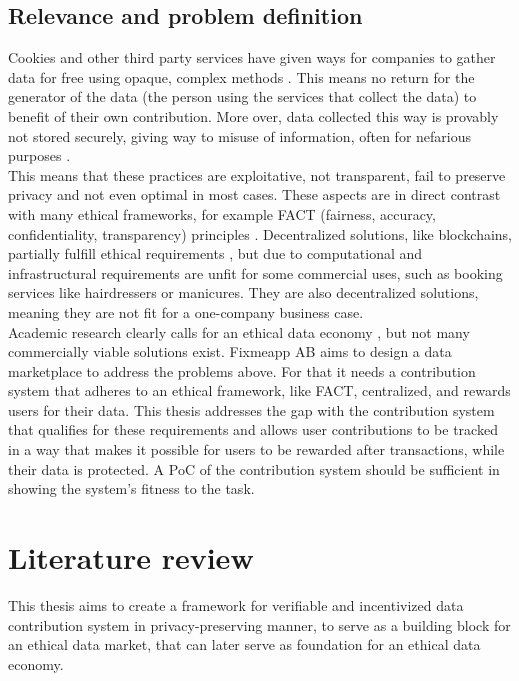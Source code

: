 \documentclass[a4paper,11pt]{report} %
\theoremstyle{change}
\theoremstyle{theoremstyle}
\begin{document}
\section{Relevance and problem definition}
Cookies and other third party services have given ways for companies to gather data for free using opaque, complex methods \cite{altaweel2015web}\cite{demir2022towards}\cite{narayanan2017princeton}\cite{veale2022adtech}. This means no return for the generator of the data (the person using the services that collect the data) to benefit of their own contribution. More over, data collected this way is provably not stored securely, giving way to misuse of information, often for nefarious purposes \cite{langvardt2024media}\cite{cross2025examining}.\\
This means that these practices are exploitative, not transparent, fail to preserve privacy and not even optimal in most cases. These aspects are in direct contrast with many ethical frameworks, for example FACT (fairness, accuracy, confidentiality, transparency) principles \cite{sohail2024data}. Decentralized solutions, like blockchains, partially fulfill ethical requirements \cite{sansone2023blockchain}, but due to computational and infrastructural requirements are unfit for some commercial uses, such as booking services like hairdressers or manicures. They are also decentralized solutions, meaning they are not fit for a one-company business case.\\
Academic research clearly calls for an ethical data economy \cite{koskinen2019if}\cite{koskinen2023ethical}\cite{rantanen2020ethical}\cite{rantanen2020humans}, but not many commercially viable solutions exist. Fixmeapp AB aims to design a data marketplace to address the problems above. For that it needs a contribution system that adheres to an ethical framework, like FACT, centralized, and rewards users for their data. This thesis addresses the gap with the contribution system that qualifies for these requirements and allows user contributions to be tracked in a way that makes it possible for users to be rewarded after transactions, while their data is protected. A PoC of the contribution system should be sufficient in showing the system's fitness to the task.


\chapter{Literature review}
This thesis aims to create a framework for verifiable and incentivized data contribution system in privacy-preserving manner, to serve as a building block for an ethical data market, that can later serve as foundation for an ethical data economy. 
\end{document}

